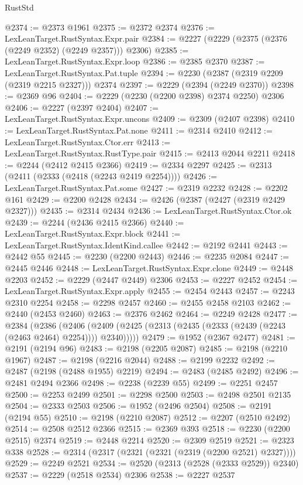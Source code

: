 \begin{lexlean}{RustStd}
\begin{coremodule}
{\begin{coremodule}
{{{{{{{{{{{{{{{{{{{{{{{{{{{{{{{{{{@2374 := @2373 @1961
@2375 := @2372 @2374
@2376 := LexLeanTarget.RustSyntax.Expr.pair
@2384 := @2227 (@2229 (@2375 (@2376 (@2249 @2352) (@2249 @2357))) @2306)
@2385 := LexLeanTarget.RustSyntax.Expr.loop
@2386 := @2385 @2370
@2387 := LexLeanTarget.RustSyntax.Pat.tuple
@2394 := @2230 (@2387 (@2319 @2209 (@2319 @2215 @2327))) @2374
@2397 := @2229 (@2394 (@2249 @2370))
@2398 := @2369 @96
@2404 := @2229 (@2230 (@2200 @2398) @2374 @2250) @2306
@2406 := @2227 (@2397 @2404)
@2407 := LexLeanTarget.RustSyntax.Expr.uncons
@2409 := @2309 (@2407 @2398)
@2410 := LexLeanTarget.RustSyntax.Pat.none
@2411 := @2314 @2410
@2412 := LexLeanTarget.RustSyntax.Ctor.err
@2413 := LexLeanTarget.RustSyntax.RustType.pair
@2415 := @2413 @2044 @2211
@2418 := @2244 (@2412 @2415 @2366)
@2419 := @2334 @2297
@2425 := @2313 (@2411 (@2333 (@2418 (@2243 @2419 @2254))))
@2426 := LexLeanTarget.RustSyntax.Pat.some
@2427 := @2319 @2232
@2428 := @2202 @161
@2429 := @2200 @2428
@2434 := @2426 (@2387 (@2427 (@2319 @2429 @2327)))
@2435 := @2314 @2434
@2436 := LexLeanTarget.RustSyntax.Ctor.ok
@2439 := @2244 (@2436 @2415 @2366)
@2440 := LexLeanTarget.RustSyntax.Expr.block
@2441 := LexLeanTarget.RustSyntax.IdentKind.callee
@2442 := @2192 @2441
@2443 := @2442 @55
@2445 := @2230 (@2200 @2443)
@2446 := @2235 @2084
@2447 := @2445 @2446
@2448 := LexLeanTarget.RustSyntax.Expr.clone
@2449 := @2448 @2203
@2452 := @2229 (@2447 @2449) @2306
@2453 := @2227 @2452
@2454 := LexLeanTarget.RustSyntax.Expr.apply
@2455 := @2454 @2443
@2457 := @2243 @2310 @2254
@2458 := @2298 @2457
@2460 := @2455 @2458 @2103
@2462 := @2440 (@2453 @2460)
@2463 := @2376 @2462
@2464 := @2249 @2428
@2477 := @2384
    (@2386
      (@2406 (@2409 (@2425 (@2313 (@2435 (@2333 (@2439 (@2243 (@2463 @2464) @2254)))) @2340)))))
@2479 := @1952 (@2367 @2477)
@2481 := @2191 (@2194 @96)
@2483 := @2198 (@2205 @2087)
@2485 := @2198 (@2210 @1967)
@2487 := @2198 (@2216 @2044)
@2488 := @2199 @2232
@2492 := @2487 (@2198 (@2488 @1955) @2219)
@2494 := @2483 (@2485 @2492)
@2496 := @2481 @2494 @2366
@2498 := @2238 (@2239 @55)
@2499 := @2251 @2457
@2500 := @2253 @2499
@2501 := @2298 @2500
@2503 := @2498 @2501 @2135
@2504 := @2333 @2503
@2506 := @1952 (@2496 @2504)
@2508 := @2191 (@2194 @55)
@2510 := @2198 (@2210 @2087)
@2512 := @2207 (@2510 @2492)
@2514 := @2508 @2512 @2366
@2515 := @2369 @393
@2518 := @2230 (@2200 @2515) @2374
@2519 := @2448 @2214
@2520 := @2309 @2519
@2521 := @2323 @338
@2528 := @2314 (@2317 (@2321 (@2321 (@2319 (@2200 @2521) @2327))))
@2529 := @2249 @2521
@2534 := @2520 (@2313 (@2528 (@2333 @2529)) @2340)
@2537 := @2229 (@2518 @2534) @2306
@2538 := @2227 @2537
}}}}}}}}}}}}}}}}}}}}}}}}}}}}}}}}}}
\end{coremodule}}
\end{coremodule}
\end{lexlean}
